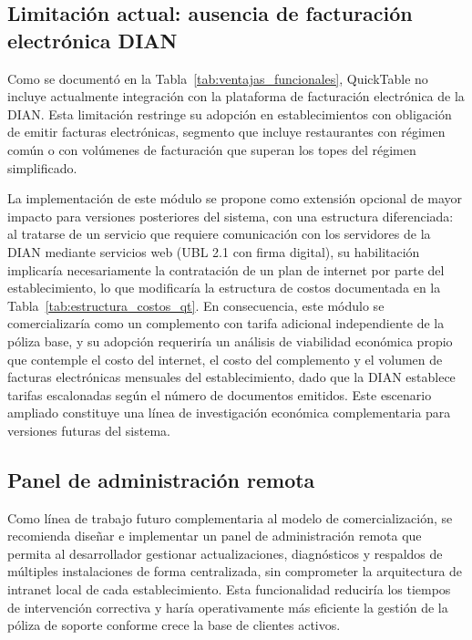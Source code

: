 \subsection*{Limitación actual: ausencia de facturación electrónica DIAN}

Como se documentó en la Tabla~\ref{tab:ventajas_funcionales}, QuickTable no incluye
actualmente integración con la plataforma de facturación electrónica de la DIAN. Esta
limitación restringe su adopción en establecimientos con obligación de emitir facturas
electrónicas, segmento que incluye restaurantes con régimen común o con volúmenes de
facturación que superan los topes del régimen simplificado.

La implementación de este módulo se propone como extensión opcional de mayor impacto
para versiones posteriores del sistema, con una estructura diferenciada: al tratarse de
un servicio que requiere comunicación con los servidores de la DIAN mediante servicios
web (UBL 2.1 con firma digital), su habilitación implicaría necesariamente la
contratación de un plan de internet por parte del establecimiento, lo que modificaría
la estructura de costos documentada en la Tabla~\ref{tab:estructura_costos_qt}. En
consecuencia, este módulo se comercializaría como un complemento con tarifa adicional
independiente de la póliza base, y su adopción requeriría un análisis de viabilidad
económica propio que contemple el costo del internet, el costo del complemento y el
volumen de facturas electrónicas mensuales del establecimiento, dado que la DIAN
establece tarifas escalonadas según el número de documentos emitidos. Este escenario
ampliado constituye una línea de investigación económica complementaria para versiones
futuras del sistema.

\subsection*{Panel de administración remota}

Como línea de trabajo futuro complementaria al modelo de comercialización, se recomienda
diseñar e implementar un panel de administración remota que permita al desarrollador
gestionar actualizaciones, diagnósticos y respaldos de múltiples instalaciones de forma
centralizada, sin comprometer la arquitectura de intranet local de cada establecimiento.
Esta funcionalidad reduciría los tiempos de intervención correctiva y haría operativamente
más eficiente la gestión de la póliza de soporte conforme crece la base de clientes activos.